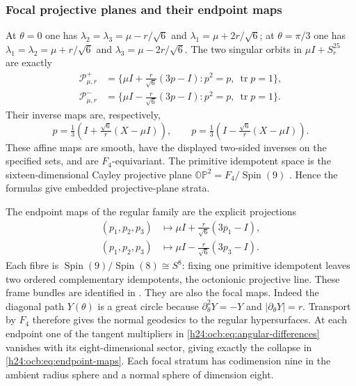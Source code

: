 \subsubsection{Focal projective planes and their endpoint maps}
\label{h24:ocb:sec:focal-strata}

At $\theta=0$ one has
$\lambda_2=\lambda_3=\mu-r/\sqrt6$ and
$\lambda_1=\mu+2r/\sqrt6$; at $\theta=\pi/3$ one has
$\lambda_1=\lambda_2=\mu+r/\sqrt6$ and
$\lambda_3=\mu-2r/\sqrt6$. The two singular orbits in
$\mu I+S_r^{25}$ are exactly
\begin{equation}
 \begin{aligned}
 \mathcal P^+_{\mu,r}
 &=\{\mu I+\tfrac r{\sqrt6}(3p-I):p^2=p,\
                                       \operatorname{tr}p=1\},\\
 \mathcal P^-_{\mu,r}
 &=\{\mu I-\tfrac r{\sqrt6}(3p-I):p^2=p,\
                                       \operatorname{tr}p=1\}.
 \end{aligned}
 \label{h24:ocb:eq:focal-planes}\tag{OCB33}
\end{equation}
Their inverse maps are, respectively,
\begin{equation}
 p=\tfrac13\left(I+\tfrac{\sqrt6}{r}(X-\mu I)\right),\qquad
 p=\tfrac13\left(I-\tfrac{\sqrt6}{r}(X-\mu I)\right).
 \label{h24:ocb:eq:focal-inverses}\tag{OCB34}
\end{equation}
These affine maps are smooth, have the displayed two-sided inverses
on the specified sets, and are $F_4$-equivariant. The primitive
idempotent space is the sixteen-dimensional Cayley projective plane
$\mathbb O\mathbb P^2=F_4/\operatorname{Spin}(9)$
\cite[Theorems~2.7.4 and 2.8.3]{h24:Yokota2009}
\cite[Section~2.3]{h24:MareWillems2013}. Hence the formulas give embedded
projective-plane strata.

The endpoint maps of the regular family are the explicit projections
\begin{equation}
 \begin{aligned}
 (p_1,p_2,p_3)&\longmapsto
             \mu I+\tfrac r{\sqrt6}(3p_1-I),\\
 (p_1,p_2,p_3)&\longmapsto
             \mu I-\tfrac r{\sqrt6}(3p_3-I).
 \end{aligned}
 \label{h24:ocb:eq:endpoint-maps}\tag{OCB35}
\end{equation}
Each fibre is $\operatorname{Spin}(9)/\operatorname{Spin}(8)\cong S^8$:
fixing one primitive idempotent leaves two ordered complementary
idempotents, the octonionic projective line. These frame bundles
are identified in \cite[Sections~2.3--2.6]{h24:MareWillems2013}.
They are also the focal maps. Indeed the diagonal path $Y(\theta)$
is a great circle because $\partial_\theta^2Y=-Y$ and
$|\partial_\theta Y|=r$. Transport by $F_4$ therefore gives the
normal geodesics to the regular hypersurfaces. At each endpoint one
of the tangent multipliers in \eqref{h24:ocb:eq:angular-differences}
vanishes with its eight-dimensional sector, giving exactly the
collapse in \eqref{h24:ocb:eq:endpoint-maps}. Each focal stratum has
codimension nine in the ambient radius sphere and a normal sphere
of dimension eight.

